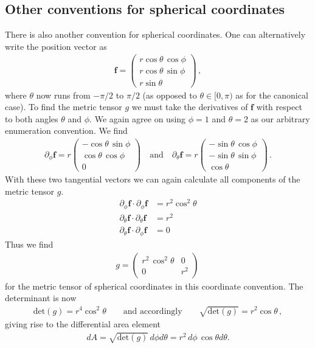 \documentclass[11pt, DINA4, fleqn]{amsart}
\begin{document}
\subsection{Other conventions for spherical coordinates}

There is also another convention for spherical coordinates.
One can alternatively write the position vector as
\begin{align}
	\boldsymbol{f} = \begin{pmatrix}
		r \cos\theta \, \cos\phi \\
		r \cos\theta \, \sin\phi \\
		r \sin\theta
	\end{pmatrix} \, ,
\end{align}
where $\theta$ now runs from $-\pi/2$ to $\pi/2$ (as opposed to $\theta\in[0,\pi)$ as for the canonical case).
To find the metric tensor $g$ we must take the derivatives of $\boldsymbol{f}$ with respect to both angles $\theta$ and $\phi$. We again agree on using $\phi = 1$ and $\theta = 2$ as our arbitrary enumeration convention.
We find
\begin{align}
\partial_{\phi}\boldsymbol{f} = r \begin{pmatrix}
-\cos\theta\, \sin\phi \\
\cos\theta\, \cos\phi \\
0
\end{pmatrix}
\quad \text{and} \quad
\partial_{\theta}\boldsymbol{f} = r \begin{pmatrix}
-\sin\theta\, \cos\phi \\
-\sin\theta\, \sin\phi \\
\cos\theta
\end{pmatrix}
\, .
\end{align}
With these two tangential vectors we can again calculate all components of the metric tensor $g$.
\begin{align}
\partial_{\phi}\boldsymbol{f} \cdot \partial_{\phi}\boldsymbol{f} &= 
r^2\cos^2\theta \\
\partial_{\theta}\boldsymbol{f} \cdot \partial_{\theta}\boldsymbol{f} &= 
r^2 \\
\partial_{\theta}\boldsymbol{f}\cdot \partial_{\phi}\boldsymbol{f} &= 0
\end{align}
Thus we find
\begin{align}
g = \begin{pmatrix}
r^2\, \cos^2\theta & 0 \\
0 & r^2
\end{pmatrix} \, 
\end{align}
for the metric tensor of spherical coordinates in this coordinate convention.
The determinant is now
\begin{align}
\text{det}(g) = r^4 \cos^2\theta \qquad \text{and accordingly} \qquad
\sqrt{\text{det}(g)} = r^2\cos\theta \, ,
\end{align}
giving rise to the differential area element
\begin{align}
dA = \sqrt{\text{det}(g)} \, d\phi d\theta = r^2 \, d\phi \, \cos\theta d\theta.
\end{align}
\end{document}
